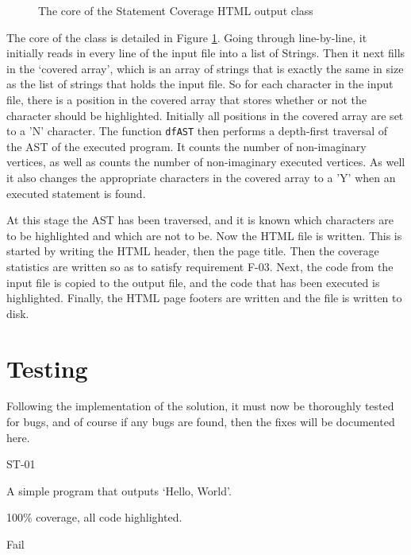 
\begin{figure}[h]
	
	\caption{The core of the Statement Coverage HTML output class}
	\label{lst:StatementCoverageHTMLCore}
\end{figure}

The core of the class is detailed in Figure \ref{lst:StatementCoverageHTMLCore}. Going through line-by-line, it initially reads in every line of the input file into a list of Strings. Then it next fills in the `covered array', which is an array of strings that is exactly the same in size as the list of strings that holds the input file. So for each character in the input file, there is a position in the covered array that stores whether or not the character should be highlighted. Initially all positions in the covered array are set to a 'N' character. The function \verb|dfAST| then performs a depth-first traversal of the AST of the executed program. It counts the number of non-imaginary vertices, as well as counts the number of non-imaginary executed vertices. As well it also changes the appropriate characters in the covered array to a 'Y' when an executed statement is found. 

At this stage the AST has been traversed, and it is known which characters are to be highlighted and which are not to be. Now the HTML file is written. This is started by writing the HTML header, then the page title. Then the coverage statistics are written so as to satisfy requirement F-03. Next, the code from the input file is copied to the output file, and the code that has been executed is highlighted. Finally, the HTML page footers are written and the file is written to disk.

\section{Testing}
Following the implementation of the solution, it must now be thoroughly tested for bugs, and of course if any bugs are found, then the fixes will be documented here.

\begin{samepage}
\begin{description}[style=sameline,leftmargin=3.5cm,nolistsep]
\item[\hspace*{0.3cm}Label] ST-01
\item[\hspace*{0.3cm}Description] A simple program that outputs `Hello, World'.
\item[\hspace*{0.3cm}Expected Output] 100\% coverage, all code highlighted.
\item[\hspace*{0.3cm}Result] Fail
\end{description}
\end{samepage}

